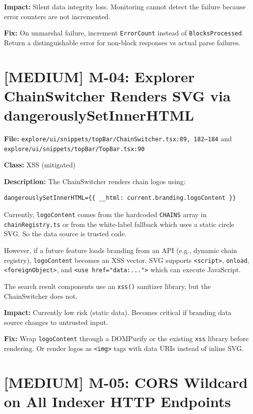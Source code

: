 \documentclass{article}
\begin{document}
\textbf{Impact:} Silent data integrity loss. Monitoring cannot detect
the failure because error counters are not incremented.

\textbf{Fix:} On unmarshal failure, increment \texttt{ErrorCount} instead of
\texttt{BlocksProcessed}. Return a distinguishable error for non-block
responses vs actual parse failures.


\section{[MEDIUM] M-04: Explorer ChainSwitcher Renders SVG via dangerouslySetInnerHTML}

\textbf{File:} \texttt{explore/ui/snippets/topBar/ChainSwitcher.tsx:89, 182--184}
and \texttt{explore/ui/snippets/topBar/TopBar.tsx:90}

\textbf{Class:} XSS (mitigated)

\textbf{Description:}
The ChainSwitcher renders chain logos using:
\begin{lstlisting}
dangerouslySetInnerHTML={{ __html: current.branding.logoContent }}
\end{lstlisting}

Currently, \texttt{logoContent} comes from the hardcoded \texttt{CHAINS}
array in \texttt{chainRegistry.ts} or from the white-label fallback which
uses a static circle SVG. So the data source is trusted code.

However, if a future feature loads branding from an API (e.g., dynamic chain
registry), \texttt{logoContent} becomes an XSS vector. SVG supports
\texttt{<script>}, \texttt{onload}, \texttt{<foreignObject>}, and
\texttt{<use href="data:...">} which can execute JavaScript.

The search result components use an \texttt{xss()} sanitizer library, but
the ChainSwitcher does not.

\textbf{Impact:} Currently low risk (static data). Becomes critical if
branding data source changes to untrusted input.

\textbf{Fix:} Wrap \texttt{logoContent} through a DOMPurify or the existing
\texttt{xss} library before rendering. Or render logos as \texttt{<img>}
tags with data URIs instead of inline SVG.


\section{[MEDIUM] M-05: CORS Wildcard on All Indexer HTTP Endpoints}
\end{document}
